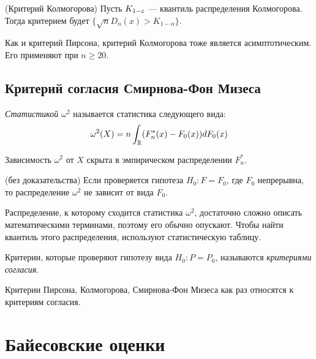 \begin{solution} (Критерий Колмогорова)
	Пусть $K_{1 - \varepsilon}$ --- квантиль распределения Колмогорова. Тогда критерием будет $\{\sqrt{n}D_n(x) > K_{1 - \alpha}\}$.
\end{solution}

\begin{note}
	Как и критерий Пирсона, критерий Колмогорова тоже является асимптотическим. Его применяют при $n \ge 20$.
\end{note}

\subsection{Критерий согласия Смирнова-Фон Мизеса}

\begin{definition}
	\textit{Статистикой $\omega^2$} называется статистика следующего вида:
	\[
		\omega^2(X) = n\int_{\mathbb{R}} (F_n^*(x) - F_0(x))dF_0(x)
	\]
\end{definition}

\begin{anote}
	Зависимость $\omega^2$ от $X$ скрыта в эмпирическом распределении $F_n^*$.
\end{anote}

\begin{theorem} (без доказательства)
	Если проверяется гипотеза $H_0 \colon F = F_0$, где $F_0$ непрерывна, то распределение $\omega^2$ не зависит от вида $F_0$.
\end{theorem}

\begin{anote}
	Распределение, к которому сходится статистика $\omega^2$, достаточно сложно описать математическими терминами, поэтому его обычно опускают. Чтобы найти квантиль этого распределения, используют статистическую таблицу.
\end{anote}

\begin{definition}
	Критерии, которые проверяют гипотезу вида $H_0 \colon P = P_0$, называются \textit{критериями согласия}.
\end{definition}

\begin{note}
	Критерии Пирсона, Колмогорова, Смирнова-Фон Мизеса как раз относятся к критериям согласия.
\end{note}

\section{Байесовские оценки}

